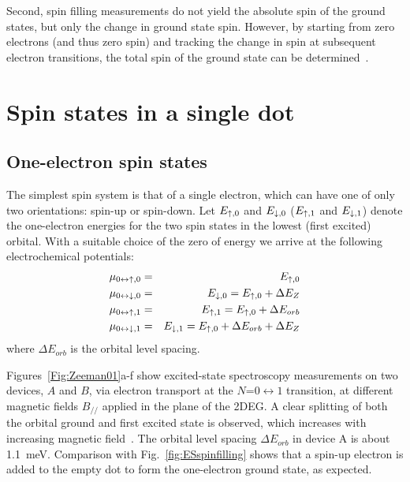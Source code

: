 \documentclass[rmp,twocolumn,aps]{revtex4}
\begin{document}
Second, spin filling measurements do not yield the absolute spin
of the ground states, but only the change in ground state spin.
However, by starting from zero electrons (and thus zero spin) and
tracking the change in spin at subsequent electron transitions,
the total spin of the ground state can be
determined~\cite{BeverenNJP2005}.

\section{Spin states in a single dot}
\label{Section:SingleDotSpin}
\subsection{One-electron spin states}
The simplest spin system is that of a single electron, which can
have one of only two orientations: spin-up or spin-down. Let
$E_{\uparrow,0}$ and $E_{\downarrow,0}$ ($E_{\uparrow,1}$ and $E_{\downarrow,1}$) denote
the one-electron energies for the two spin states in the lowest
(first excited) orbital. With a suitable choice of the zero of
energy we arrive at the following electrochemical potentials:
\begin{eqnarray}
\mu_{0\leftrightarrow \uparrow,0}&=&E_{\uparrow,0} \\
\mu_{0\leftrightarrow \downarrow,0}&=&E_{\downarrow,0}=E_{\uparrow,0} + \Delta E_Z \\
\mu_{0\leftrightarrow \uparrow,1}&=&E_{\uparrow,1}=E_{\uparrow,0} + \Delta E_{orb}\\
\mu_{0\leftrightarrow \downarrow,1}&=&E_{\downarrow,1}=E_{\uparrow,0} + \Delta
E_{orb}+ \Delta E_Z
\end{eqnarray}
where $\Delta E_{orb}$ is the orbital level spacing.

Figures~\ref{Fig:Zeeman01}a-f show excited-state spectroscopy
measurements on two devices, $A$ and $B$, via electron transport
at the $N$=$0\leftrightarrow 1$ transition, at different magnetic
fields $B_{//}$ applied in the plane of the 2DEG. A clear
splitting of both the orbital ground and first excited state is
observed, which increases with increasing magnetic
field~\cite{HansonPRL2003,PotokPRL2003,BeverenNJP2005,Haug05}. The
orbital level spacing $\Delta E_{orb}$ in device A is about
1.1~meV. Comparison with Fig.~\ref{fig:ESspinfilling} shows that a
spin-up electron is added to the empty dot to form the
one-electron ground state, as expected.
\end{document}
